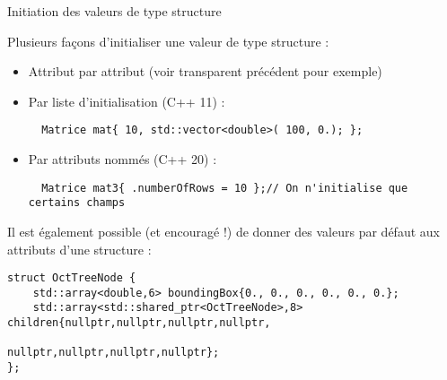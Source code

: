 \documentclass[compress,10pt,aspectratio=169]{beamer}
\begin{document}
  \begin{frame}[fragile]{Initiation des valeurs de type structure}
    \scriptsize
  
    Plusieurs façons d'initialiser une valeur de type structure :
    \begin{itemize}
  \item Attribut par attribut (voir transparent précédent pour exemple)
  \item Par liste d'initialisation (C++ 11) :
  \begin{verbatim}
  Matrice mat{ 10, std::vector<double>( 100, 0.); };
  \end{verbatim}
  \item Par attributs nommés (C++ 20) :
  \begin{verbatim}
  Matrice mat3{ .numberOfRows = 10 };// On n'initialise que certains champs
  \end{verbatim}
  \end{itemize}
  
  Il est également possible (et encouragé !) de donner des valeurs par défaut aux attributs d'une structure :
  \begin{verbatim}
struct OctTreeNode {
    std::array<double,6> boundingBox{0., 0., 0., 0., 0., 0.};
    std::array<std::shared_ptr<OctTreeNode>,8> children{nullptr,nullptr,nullptr,nullptr,
                                                        nullptr,nullptr,nullptr,nullptr};
};  
  \end{verbatim}  
  \end{frame}
  
\end{document}
